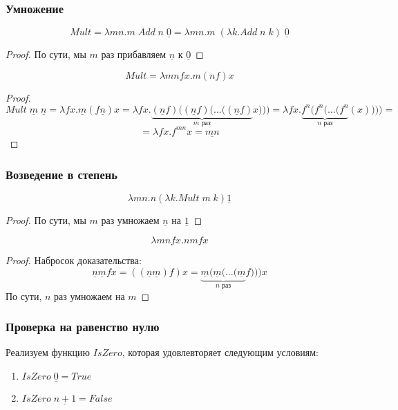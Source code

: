 \subsubsection{Умножение}
\begin{definition}
    \[Mult = \lambda mn.m \;Add\;n\;\underline{0} = \lambda mn.m \;(\lambda k.Add\;n\;k)\;\underline{0}\]
\end{definition}
\begin{proof}
    По сути, мы \(m\) раз прибавляем \(\underline{n}\) к \(\underline{0}\)
\end{proof}

\begin{definition}
    \[Mult = \lambda mnfx.m(nf)x\]
\end{definition}
\begin{proof}
    \[Mult\;\underline{m}\;\underline{n} = \lambda fx.\underline{m}(f\underline{n})x = \lambda fx.\underbrace{(\underline{n}f)((\underline{n}f)(\dots((\underline{n}f)}_{m\text{ раз}}x))) = \lambda fx.\underbrace{f^n(f^n(\dots(f^n}_{n\text{ раз}}(x)))) =\]
    \[ = \lambda fx.f^{mn}x = \underline{mn}\]
\end{proof}

\subsubsection{Возведение в степень}
\begin{definition}
    \[\lambda mn.n(\lambda k.Mult\;m\;k)\underline{1}\]
\end{definition}
\begin{proof}
    По сути, мы \(m\) раз умножаем \(\underline{n}\) на \(\underline{1}\)
\end{proof}

\begin{definition}
    \[\lambda mnfx.nmfx\]
\end{definition}
\begin{proof}
    Набросок доказательства:
    \[\underline{n}\underline{m}fx = ((\underline{n}\underline{m})f)x = \underbrace{\underline{m}(\underline{m}(\dots(\underline{m}}_{n\text{ раз}}f)))x\]
    По сути, \(n\) раз умножаем на \(m\)
\end{proof}

\subsubsection{Проверка на равенство нулю}
Реализуем функцию \(IsZero\), которая удовлевторяет следующим условиям:
\begin{enumerate}
    \item \(IsZero\;\underline{0} = True\)
    \item \(IsZero\;\underline{n + 1} = False\)
\end{enumerate}

